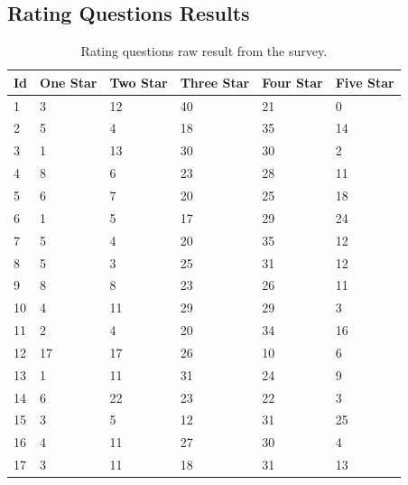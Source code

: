 \documentclass[a4paper,12pt]{article}
\begin{document}
    \subsection{Rating Questions Results}
    \label{subsec:ratingresults}
    \begin{table}[!htbp]
        \begin{center}
            \begin{tabularx}{\textwidth}{llllll}
                \toprule
                Id & One Star & Two Star & Three Star & Four Star & Five Star \\
                \midrule
                1  & 3        & 12       & 40         & 21        & 0         \\
                2  & 5        & 4        & 18         & 35        & 14        \\
                3  & 1        & 13       & 30         & 30        & 2         \\
                4  & 8        & 6        & 23         & 28        & 11        \\
                5  & 6        & 7        & 20         & 25        & 18        \\
                6  & 1        & 5        & 17         & 29        & 24        \\
                7  & 5        & 4        & 20         & 35        & 12        \\
                8  & 5        & 3        & 25         & 31        & 12        \\
                9  & 8        & 8        & 23         & 26        & 11        \\
                10 & 4        & 11       & 29         & 29        & 3         \\
                11 & 2        & 4        & 20         & 34        & 16        \\
                12 & 17       & 17       & 26         & 10        & 6         \\
                13 & 1        & 11       & 31         & 24        & 9         \\
                14 & 6        & 22       & 23         & 22        & 3         \\
                15 & 3        & 5        & 12         & 31        & 25        \\
                16 & 4        & 11       & 27         & 30        & 4         \\
                17 & 3        & 11       & 18         & 31        & 13        \\
                \bottomrule
            \end{tabularx}
        \end{center}
        \caption{\label{tab:rawratingquestionresultstable} Rating questions raw result from the survey.}
    \end{table}
\end{document}

